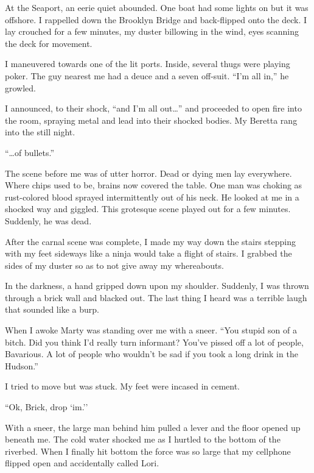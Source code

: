 At the Seaport, an eerie quiet abounded. One boat had some lights
on but it was offshore. I rappelled down the Brooklyn Bridge and
back-flipped onto the deck. I lay crouched for a few minutes, my
duster billowing in the wind, eyes scanning the deck for
movement.



I maneuvered towards one of the lit ports. Inside, several thugs
were playing poker. The guy nearest me had a deuce and a seven
off-suit. ``I'm all in,'' he growled.



I announced, to their shock, ``and I'm all
out{\ldots}'' and proceeded to open fire into the room,
spraying metal and lead into their shocked bodies. My Beretta rang
into the still night.



``{\ldots}of bullets.''



The scene before me was of utter horror. Dead or dying men lay
everywhere. Where chips used to be, brains now covered the table.
One man was choking as rust-colored blood sprayed intermittently
out of his neck. He looked at me in a shocked way and giggled. This
grotesque scene played out for a few minutes. Suddenly, he was
dead.



After the carnal scene was complete, I made my way down the stairs
stepping with my feet sideways like a ninja would take a flight of
stairs. I grabbed the sides of my duster so as to not give away my
whereabouts.



In the darkness, a hand gripped down upon my shoulder. Suddenly, I
was thrown through a brick wall and blacked out. The last thing I
heard was a terrible laugh that sounded like a burp.



When I awoke Marty was standing over me with a sneer. ``You
stupid son of a bitch. Did you think I'd really turn
informant? You've pissed off a lot of people, Bavarious. A
lot of people who wouldn't be sad if you took a long drink in
the Hudson.''



I tried to move but was stuck. My feet were incased in
cement.



``Ok, Brick, drop `im.''



With a sneer, the large man behind him pulled a lever and the floor
opened up beneath me. The cold water shocked me as I hurtled to the
bottom of the riverbed. When I finally hit bottom the force was so
large that my cellphone flipped open and accidentally called
Lori.



